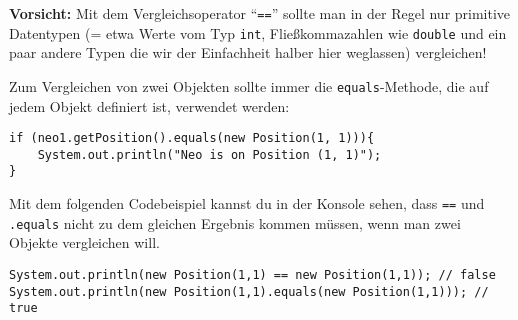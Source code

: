 \begin{Infobox}[\lstinline{==} und die \lstinline{equals()}-Methode]
	\textbf{Vorsicht:} Mit dem Vergleichsoperator \enquote{\lstinline{==}} sollte man in der Regel nur primitive Datentypen (= etwa Werte vom Typ \lstinline{int}, Fließkommazahlen wie \lstinline{double} und ein paar andere Typen die wir der Einfachheit halber hier weglassen) vergleichen!\newline

	Zum Vergleichen von zwei Objekten sollte immer die \lstinline{equals}-Methode, die auf jedem Objekt definiert ist, verwendet werden:

	\begin{lstlisting}[numbers=none]
if (neo1.getPosition().equals(new Position(1, 1))){
	System.out.println("Neo is on Position (1, 1)");
}
	\end{lstlisting}

	Mit dem folgenden Codebeispiel kannst du in der Konsole sehen, dass \lstinline{==} und \lstinline{.equals} nicht zu dem gleichen Ergebnis kommen müssen, wenn man zwei Objekte vergleichen will.

	\begin{lstlisting}[numbers=none]
System.out.println(new Position(1,1) == new Position(1,1)); // false
System.out.println(new Position(1,1).equals(new Position(1,1))); // true
	\end{lstlisting}

\end{Infobox}

